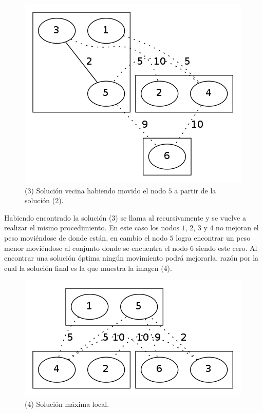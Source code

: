 \begin{figure}[H]
\begin{center}
\includegraphics[scale=0.4]{./img/local3.png}
\caption{(3) Solución vecina habiendo movido el nodo $5$ a partir de la solución (2).}
\end{center}
\end{figure}

Habiendo encontrado la solución (3) se llama al recursivamente y se vuelve a realizar el mismo procedimiento. En este caso los nodos $1$, $2$, $3$ y $4$ no mejoran el peso moviéndose de donde están, en cambio el nodo $5$ logra encontrar un peso menor moviéndose al conjunto donde se encuentra el nodo $6$ siendo este cero. Al encontrar una solución óptima ningún movimiento podrá mejorarla, razón por la cual la solución final es la que muestra la imagen (4). 

\begin{figure}[H]
\begin{center}
\includegraphics[scale=0.4]{./img/local4.png}
\caption{(4) Solución máxima local.}
\end{center}
\end{figure}

